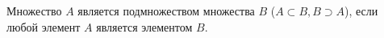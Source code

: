 
    Множество $A$ является подмножеством множества $B$ ($A\subset B, B \supset A$), если любой элемент $A$ является элементом $B$.
